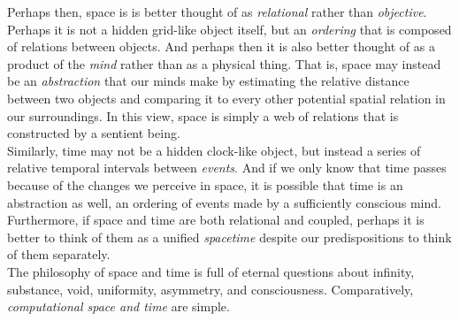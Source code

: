 Perhaps then, space is is better thought of as \textit{relational} rather than \textit{objective}. Perhaps it is not a hidden grid-like object itself, but an \textit{ordering} that is composed of relations between objects. And perhaps then it is also better thought of as a product of the \textit{mind} rather than as a physical thing. That is, space may instead be an \textit{abstraction} that our minds make by estimating the relative distance between two objects and comparing it to every other potential spatial relation in our surroundings. In this view, space is simply a web of relations that is constructed by a sentient being. \\

Similarly, time may not be a hidden clock-like object, but instead a series of relative temporal intervals between \textit{events}. And if we only know that time passes because of the changes we perceive in space, it is possible that time is an abstraction as well, an ordering of events made by a sufficiently conscious mind. Furthermore, if space and time are both relational and coupled, perhaps it is better to think of them as a unified \textit{spacetime} despite our predispositions to think of them separately. \\

The philosophy of space and time is full of eternal questions about infinity, substance, void, uniformity, asymmetry, and consciousness. Comparatively, \textit{computational space and time} are simple. \\








